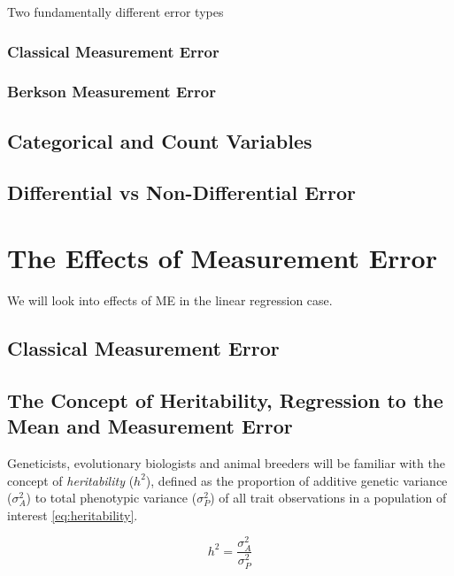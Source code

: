 \documentclass[]{book}
\theoremstyle{definition}
\theoremstyle{definition}
\theoremstyle{definition}
\theoremstyle{remark}
\begin{document}
Two fundamentally different error types

\subsection{Classical Measurement Error}\label{sec:errortypescl}

\subsection{Berkson Measurement Error}\label{sec:errortypesB}

\section{Categorical and Count
Variables}\label{categorical-and-count-variables}

\section{Differential vs Non-Differential
Error}\label{differential-vs-non-differential-error}

\hypertarget{effects}{\chapter{The Effects of Measurement
Error}\label{effects}}

We will look into effects of ME in the linear regression case.

\section{Classical Measurement Error}\label{classical-measurement-error}

\section{The Concept of Heritability, Regression to the Mean and
Measurement Error}\label{sec:heritability}

Geneticists, evolutionary biologists and animal breeders will be
familiar with the concept of \emph{heritability} (\(h^2\)), defined as
the proportion of additive genetic variance (\(\sigma_A^2\)) to total
phenotypic variance (\(\sigma_P^2\)) of all trait observations in a
population of interest \eqref{eq:heritability}.

\begin{equation}
h^2 = \frac{\sigma_A^2}{\sigma_P^2}
\label{eq:heritability}
\end{equation}
\end{document}
